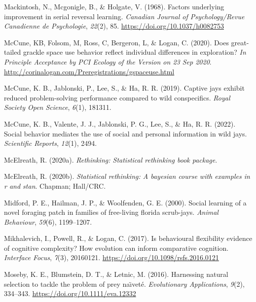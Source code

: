 \documentclass[
]{article}
\newlength{\cslhangindent}
\newenvironment{CSLReferences}[2] %
 {\begin{list}{}{%
  \setlength{\itemindent}{0pt}
  \setlength{\leftmargin}{0pt}
  \setlength{\parsep}{0pt}
  \ifodd #1
   \setlength{\leftmargin}{\cslhangindent}
   \setlength{\itemindent}{-1\cslhangindent}
  \fi
  \setlength{\itemsep}{#2\baselineskip}}}
 {\end{list}}
\begin{document}
\begin{CSLReferences}{1}{0}
Mackintosh, N., Mcgonigle, B., \& Holgate, V. (1968). Factors underlying
improvement in serial reversal learning. \emph{Canadian Journal of
Psychology/Revue Canadienne de Psychologie}, \emph{22}(2), 85.
\url{https://doi.org/10.1037/h0082753}

McCune, KB, Folsom, M, Ross, C, Bergeron, L, \& Logan, C. (2020). Does
great-tailed grackle space use behavior reflect individual differences
in exploration? \emph{In Principle Acceptance by PCI Ecology of the
Version on 23 Sep 2020}.
\url{http://corinalogan.com/Preregistrations/gspaceuse.html}

McCune, K. B., Jablonski, P., Lee, S., \& Ha, R. R. (2019). Captive jays
exhibit reduced problem-solving performance compared to wild
conspecifics. \emph{Royal Society Open Science}, \emph{6}(1), 181311.

McCune, K. B., Valente, J. J., Jablonski, P. G., Lee, S., \& Ha, R. R.
(2022). Social behavior mediates the use of social and personal
information in wild jays. \emph{Scientific Reports}, \emph{12}(1), 2494.

McElreath, R. (2020a). \emph{Rethinking: Statistical rethinking book
package}.

McElreath, R. (2020b). \emph{Statistical rethinking: A bayesian course
with examples in r and stan}. Chapman; Hall/CRC.

Midford, P. E., Hailman, J. P., \& Woolfenden, G. E. (2000). Social
learning of a novel foraging patch in families of free-living florida
scrub-jays. \emph{Animal Behaviour}, \emph{59}(6), 1199--1207.

Mikhalevich, I., Powell, R., \& Logan, C. (2017). Is behavioural
flexibility evidence of cognitive complexity? {How} evolution can inform
comparative cognition. \emph{Interface Focus}, \emph{7}(3), 20160121.
\url{https://doi.org/10.1098/rsfs.2016.0121}

Moseby, K. E., Blumstein, D. T., \& Letnic, M. (2016). Harnessing
natural selection to tackle the problem of prey na{ı̈}vet{é}.
\emph{Evolutionary Applications}, \emph{9}(2), 334--343.
\url{https://doi.org/10.1111/eva.12332}


\end{CSLReferences}
\end{document}
